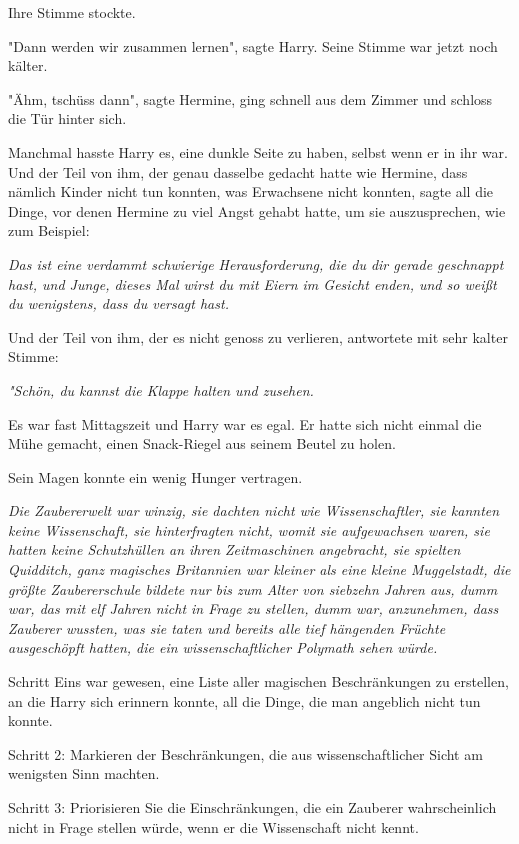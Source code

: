 {Ihre Stimme stockte.

"Dann werden wir zusammen lernen", sagte Harry. Seine Stimme war jetzt noch kälter.

"Ähm, tschüss dann", sagte Hermine, ging schnell aus dem Zimmer und schloss die Tür hinter sich.

Manchmal hasste Harry es, eine dunkle Seite zu haben, selbst wenn er in ihr war. Und der Teil von ihm, der genau dasselbe gedacht hatte wie Hermine, dass nämlich Kinder nicht tun konnten, was Erwachsene nicht konnten, sagte all die Dinge, vor denen Hermine zu viel Angst gehabt hatte, um sie auszusprechen, wie zum Beispiel:

\emph{Das ist eine verdammt schwierige Herausforderung, die du dir gerade geschnappt hast, und Junge, dieses Mal wirst du mit Eiern im Gesicht enden, und so weißt du wenigstens, dass du versagt hast.}

Und der Teil von ihm, der es nicht genoss zu verlieren, antwortete mit sehr kalter Stimme:

\emph{"Schön, du kannst die Klappe halten und zusehen.}

Es war fast Mittagszeit und Harry war es egal. Er hatte sich nicht einmal die Mühe gemacht, einen Snack-Riegel aus seinem Beutel zu holen.

Sein Magen konnte ein wenig Hunger vertragen.

\emph{Die Zaubererwelt war winzig, sie dachten nicht wie Wissenschaftler, sie kannten keine Wissenschaft, sie hinterfragten nicht, womit sie aufgewachsen waren, sie hatten keine Schutzhüllen an ihren Zeitmaschinen angebracht, sie spielten Quidditch, ganz magisches Britannien war kleiner als eine kleine Muggelstadt, die größte Zaubererschule bildete nur bis zum Alter von siebzehn Jahren aus, dumm war, das mit elf Jahren nicht in Frage zu stellen, dumm war, anzunehmen, dass Zauberer wussten, was sie taten und bereits alle tief hängenden Früchte ausgeschöpft hatten, die ein wissenschaftlicher Polymath sehen würde.}

Schritt Eins war gewesen, eine Liste aller magischen Beschränkungen zu erstellen, an die Harry sich erinnern konnte, all die Dinge, die man angeblich nicht tun konnte.

Schritt 2: Markieren der Beschränkungen, die aus wissenschaftlicher Sicht am wenigsten Sinn machten.

Schritt 3: Priorisieren Sie die Einschränkungen, die ein Zauberer wahrscheinlich nicht in Frage stellen würde, wenn er die Wissenschaft nicht kennt.

}
